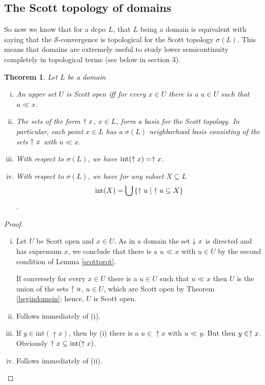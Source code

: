 \documentclass[a4paper,12pt]{article}
\newcommand{\upuparrow}{\mathrel{\reflectbox{\rotatebox[origin=c]{90}{$\twoheadrightarrow$}}}}
\newcommand{\downdownarrow}{\mathrel{\reflectbox{\rotatebox[origin=c]{90}{$\twoheadleftarrow$}}}}
\newtheorem{theorem}{Theorem}[section]
\renewcommand{\int}{\text{int}}
\begin{document}
\subsection{The Scott topology of domains}
So now we know that for a dcpo $L$, that $L$ being a domain is equivalent with saying that the $\mathcal{S}$-convergence is topological for the Scott topology $\sigma(L)$. This means that domains are extremely useful to study lower semicontinuity completely in topological terms (see below in section 3).

\begin{theorem}\label{domeinkak}
Let $L$ be a domain
    \begin{enumerate}[(i)]
        \item An upper set $U$ is Scott open iff for every $x \in U$ there is a $u \in U$ such that $u \ll x$.
        \item The sets of the form $\upuparrow x$, $x \in L$, form a basis for the Scott topology. In particular, each point $x \in L$ has a $\sigma(L)$ neighborhood basis consisting of the sets $\upuparrow x$ with $u \ll x$.
        \item With respect to $\sigma(L)$, we have $\int(\uparrow x) = \upuparrow x$.
        \item With respect to $\sigma(L)$, we have for any subset $X \subseteq L$
        $$\int(X) = \displaystyle\bigcup{\{\upuparrow u \; | \upuparrow u \subseteq X\}}$$.
    \end{enumerate}
\end{theorem}
\begin{proof}
\begin{enumerate}[(i)]
        \item Let $U$ be Scott open and $x \in U$. As in a domain the set $\downdownarrow x$ is directed and has supremum $x$, we conclude that there is a $u \ll x$ with $u \in U$ by the second condition of Lemma \ref{scottprot}.

            If conversely for every $x \in U$ there is a $u \in U$ such that $u \ll x$ then $U$ is the union of the sets $\upuparrow u$, $u \in U$, which are Scott open by Theorem \ref{begindomein}; hence, $U$ is Scott open.
        \item Follows immediately of (i).
        \item If $y \in \int(\uparrow x)$, then by (i) there is a $u \in \uparrow x$ with $u \ll y$. But then $y \in \upuparrow x$. Obviously $\upuparrow x \subseteq \int(\uparrow x)$.
        \item Follows immediately of (ii).
    \end{enumerate}
\end{proof}
\end{document}
